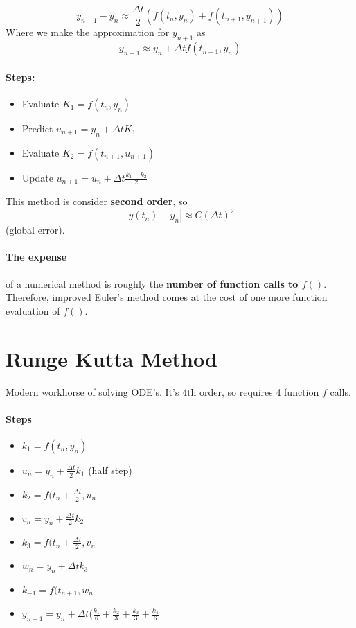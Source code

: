 \documentclass[a4paper,12pt]{report}
\begin{document}
$$y_{n+1}-y_n \approx \frac{\Delta t}{2}(f(t_n, y_n)+f(t_{n+1}, y_{n+1}))$$
Where we make the approximation for $y_{n+1}$ as
$$y_{n+1} \approx y_n + \Delta t f(t_{n+1}, y_n)$$

\paragraph{Steps: }
\begin{itemize}
\item Evaluate $K_1 = f(t_n, y_n)$
\item Predict $u_{n+1} = y_n + \Delta t K_1$
\item Evaluate $K_2 = f(t_{n+1}, u_{n+1})$
\item Update $u_{n+1} = u_n + \Delta t \frac{k_1+k_2}{2}$
\end{itemize}

This method is consider \textbf{second order}, so $$|y(t_n)-y_n| \approx C(\Delta t)^2$$ (global error). 

\paragraph{The expense } of a numerical method is roughly the \textbf{number of function calls to $f()$}. 
Therefore, improved Euler's method comes at the cost of one more function evaluation of $f()$. 

\section{Runge Kutta Method}
Modern workhorse of solving ODE's. It's 4th order, so requires 4 function $f$ calls.

\paragraph{Steps}
\begin{itemize}
\item $k_1 = f(t_n, y_n)$
\item $u_n = y_n + \frac{\Delta t}{2} k_1$ (half step)
\item $k_2 = f(t_n + \frac{\Delta t}{2}, u_n$
\item $v_n = y_n + \frac{\Delta t}{2} k_2$
\item $k_3 = f(t_n+\frac{\Delta t}{2}, v_n$
\item $w_n = y_n + \Delta t k_3$
\item $k_{-1} = f(t_{n+1}, w_n$
\item $y_{n+1} = y_n + \Delta t(\frac{k_1}{6}+\frac{k_2}{3}+\frac{k_3}{3}+\frac{k_4}{6}$
\end{itemize}
\end{document}
